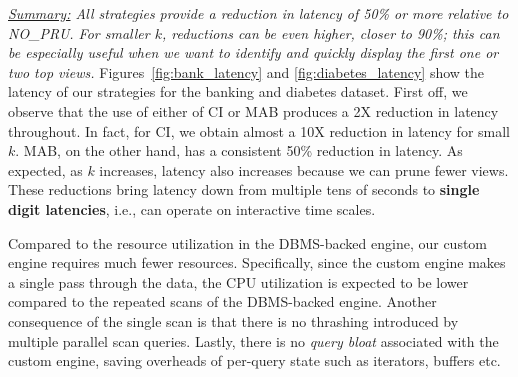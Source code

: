 {\em \underline{Summary:} All strategies provide a reduction in latency of 50\% or more
relative to NO\_PRU. For smaller $k$, reductions can be even higher, closer to 90\%; this can be
especially useful when we want to identify and quickly display the first one or two top views.}
Figures~\ref{fig:bank_latency} and \ref{fig:diabetes_latency} show the latency
of our strategies for the banking and diabetes dataset.
First off, we observe that the use of either of CI or MAB produces a 2X reduction in latency
throughout.
In fact, for CI, we obtain almost a 10X reduction in latency for small $k$. 
MAB, on the other hand, has a consistent 50\% reduction in latency. 
As expected, as $k$ increases, latency also increases because we can prune fewer views.
These reductions bring latency down from multiple tens of seconds to {\bf single digit latencies}, i.e.,
\SeeDB can operate on interactive time scales.

Compared to the resource utilization in the DBMS-backed engine, our custom engine requires much fewer resources.
Specifically, since the custom engine makes a single pass through the data, the CPU utilization is expected to be lower compared to the repeated scans of the DBMS-backed engine.
Another consequence of the single scan is that there is
no thrashing introduced by multiple parallel scan queries.
Lastly, there is no {\it query bloat} associated with
the custom engine, saving overheads of per-query state such as iterators, buffers etc.


